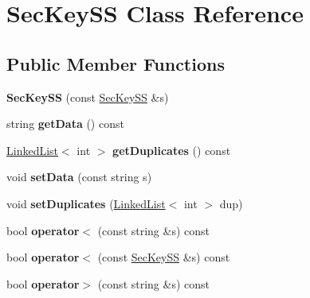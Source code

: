\hypertarget{classSecKeySS}{}\section{Sec\+Key\+SS Class Reference}
\label{classSecKeySS}
\subsection*{Public Member Functions}
\begin{DoxyCompactItemize}
\item 
\mbox{\label{classSecKeySS_a3554b7d953e609578660dc27c8c855c5}} 
{\bfseries Sec\+Key\+SS} (const \hyperlink{classSecKeySS}{Sec\+Key\+SS} \&s)
\item 
\mbox{\label{classSecKeySS_add52510d280d0ca89b653386500f08f5}} 
string {\bfseries get\+Data} () const
\item 
\mbox{\label{classSecKeySS_aaae9db891cfcdc3f78d8a44145f4f08c}} 
\hyperlink{classLinkedList}{Linked\+List}$<$ int $>$ {\bfseries get\+Duplicates} () const
\item 
\mbox{\label{classSecKeySS_a36138c92d21970c5dc22c6517a139d2b}} 
void {\bfseries set\+Data} (const string s)
\item 
\mbox{\label{classSecKeySS_ac1d550d7d3ad864f169d63523031a341}} 
void {\bfseries set\+Duplicates} (\hyperlink{classLinkedList}{Linked\+List}$<$ int $>$ dup)
\item 
\mbox{\label{classSecKeySS_a78079357a58189d507415df5200fa1de}} 
bool {\bfseries operator$<$} (const string \&s) const
\item 
\mbox{\label{classSecKeySS_a7851dc86b5a8658d8dc8fd54174aaee9}} 
bool {\bfseries operator$<$} (const \hyperlink{classSecKeySS}{Sec\+Key\+SS} \&s) const
\item 
\mbox{\label{classSecKeySS_a6b069a8bbb129059eab7158c3644c05d}} 
bool {\bfseries operator$>$} (const string \&s) const
\item 
\mbox{\label{classSecKeySS_a6d33595d05da2f8160754962f3a72c9e}} 

\end{DoxyCompactItemize}
